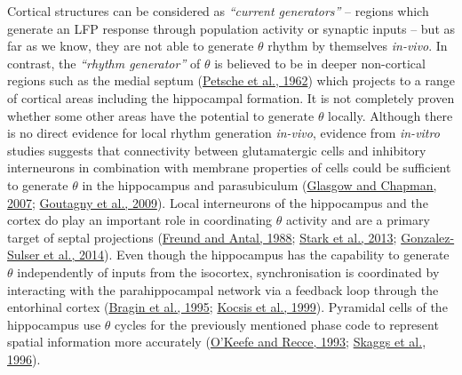 \documentclass[
  12pt,
  a4paper,
  openany]{book}
\begin{document}
\noindent
Cortical structures can be considered as \emph{``current generators''} -- regions which generate an LFP response through population activity or synaptic inputs -- but as far as we know, they are not able to generate \(\theta\) rhythm by themselves \emph{in-vivo}. In contrast, the \emph{``rhythm generator''} of \(\theta\) is believed to be in deeper non-cortical regions such as the medial septum (\protect\hyperlink{ref-petsche_significance_1962}{Petsche et al., 1962}) which projects to a range of cortical areas including the hippocampal formation. It is not completely proven whether some other areas have the potential to generate \(\theta\) locally. Although there is no direct evidence for local rhythm generation \emph{in-vivo}, evidence from \emph{in-vitro} studies suggests that connectivity between glutamatergic cells and inhibitory interneurons in combination with membrane properties of cells could be sufficient to generate \(\theta\) in the hippocampus and parasubiculum (\protect\hyperlink{ref-glasgow_local_2007}{Glasgow and Chapman, 2007}; \protect\hyperlink{ref-goutagny_self-generated_2009}{Goutagny et al., 2009}). Local interneurons of the hippocampus and the cortex do play an important role in coordinating \(\theta\) activity and are a primary target of septal projections (\protect\hyperlink{ref-freund_gaba-containing_1988}{Freund and Antal, 1988}; \protect\hyperlink{ref-stark_inhibition-induced_2013}{Stark et al., 2013}; \protect\hyperlink{ref-gonzalez-sulser_gabaergic_2014}{Gonzalez-Sulser et al., 2014}). Even though the hippocampus has the capability to generate \(\theta\) independently of inputs from the isocortex, synchronisation is coordinated by interacting with the parahippocampal network via a feedback loop through the entorhinal cortex (\protect\hyperlink{ref-bragin_gamma_1995}{Bragin et al., 1995}; \protect\hyperlink{ref-kocsis_interdependence_1999}{Kocsis et al., 1999}). Pyramidal cells of the hippocampus use \(\theta\) cycles for the previously mentioned phase code to represent spatial information more accurately (\protect\hyperlink{ref-okeefe_phase_1993}{O'Keefe and Recce, 1993}; \protect\hyperlink{ref-skaggs_theta_1996}{Skaggs et al., 1996}).
\end{document}
